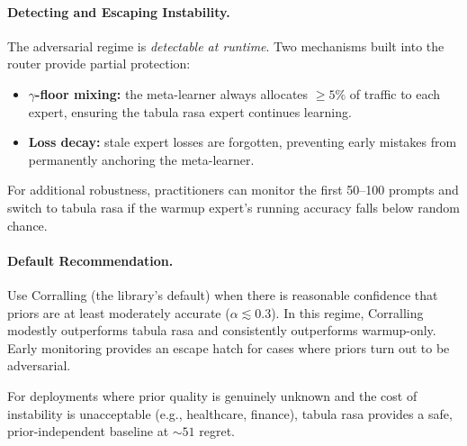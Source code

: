 \paragraph{Detecting and Escaping Instability.}
The adversarial regime is \emph{detectable at runtime}.  Two mechanisms
built into the router provide partial protection:
\begin{itemize}[nosep]
    \item \textbf{$\gamma$-floor mixing:} the meta-learner always
          allocates ${\geq}5\%$ of traffic to each expert, ensuring
          the tabula rasa expert continues learning.
    \item \textbf{Loss decay:} stale expert losses are forgotten,
          preventing early mistakes from permanently anchoring the
          meta-learner.
\end{itemize}
For additional robustness, practitioners can monitor the first 50--100
prompts and switch to tabula rasa if the warmup expert's running
accuracy falls below random chance.

\paragraph{Default Recommendation.}
Use Corralling (the library's default) when there is reasonable
confidence that priors are at least moderately accurate
($\alpha \lesssim 0.3$).  In this regime, Corralling modestly
outperforms tabula rasa and consistently outperforms warmup-only.
Early monitoring provides an escape hatch for cases where priors turn
out to be adversarial.

For deployments where prior quality is genuinely unknown and the cost
of instability is unacceptable (e.g., healthcare, finance), tabula
rasa provides a safe, prior-independent baseline at ${\sim}51$ regret.
